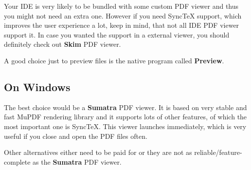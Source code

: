 \documentclass[
    draft
]{scrartcl}
\begin{document}
Your IDE is very likely to be bundled with some custom PDF viewer and thus you
    might not need an extra one.
%
However if you need Sync\TeX{} support, which improves the user experience a
    lot, keep in mind, that not all IDE PDF viewer support it.
%
In case you wanted the support in a external viewer, you should definitely check
    out \textbf{Skim} PDF viewer.

%
A good choice just to preview files is the native program called
    \textbf{Preview}.

%
\subsection{On Windows}

The best choice would be a \textbf{Sumatra} PDF viewer.
%
It is based on very stable and fast MuPDF rendering library and it supports lots
    of other features, of which the most important one is Sync\TeX{}.
%
This viewer launches immediately, which is very useful if you close and open the
    PDF files often.

%
Other alternatives either need to be paid for or they are not as
    reliable/feature-complete as the \textbf{Sumatra} PDF viewer.
\end{document}
